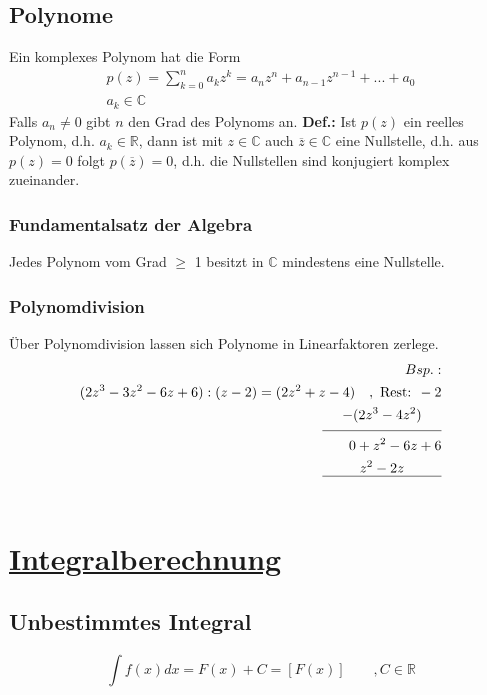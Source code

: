 \documentclass[12pt,a4paper]{article}%
\numberwithin{equation}{section}
\newcommand{\R}{\mathbb{R}} %
\newcommand{\C}{\mathbb{C}}
\def\defF{\textbf{Def.: }}
\numberwithin{equation}{subsection}
\begin{document}
  \subsection{Polynome}
  Ein komplexes Polynom hat die Form
  \begin{align}
    p(z) = \sum_{k=0}^n a_k z^k = a_n z^n + a_{n-1} z^{n-1} + ... + a_0 \\
    a_k \in \C \nonumber
  \end{align}
  Falls $a_n \neq 0$ gibt $n$ den Grad des Polynoms an.
  \newline
  \defF \glqq Ist $p(z)$ ein reelles Polynom, d.h. $a_k \in \R$, dann ist mit $z\in \C$ auch 
  $\overline{z} \in \C$ eine Nullstelle, d.h. aus $p(z) = 0$ folgt $p(\overline{z}) = 0$, d.h. die
  Nullstellen sind konjugiert komplex zueinander. \grqq \cite{HM12}

	\subsubsection{Fundamentalsatz der Algebra}
	  Jedes Polynom vom Grad $\geq$ 1 besitzt in $\C$ mindestens eine Nullstelle. 
  
  \subsubsection{Polynomdivision}
    Über Polynomdivision lassen sich Polynome in Linearfaktoren zerlege. 
    \begin{align}
      Bsp.:  \nonumber\\
      (2z^3 - 3z^2 -6z +6) : (z-2) = (2z^2 +z -4)\quad ,\text{ Rest: } -2 \nonumber\\
      \underset{\text{\rule{3cm}{0.4pt}}}{-(2z^3 - 4z^2)} \nonumber \\
      0 + z^2 - 6z + 6 \nonumber \\
      \qquad \underset{\text{\rule[5mm]{3cm}{0.4pt}}}{z^2-2z} \nonumber \\
    \end{align}








\section{\underline{Integralberechnung}}
\subsection{Unbestimmtes Integral}
\begin{equation}
\int f(x) dx = F(x) + C = [F(x)]\qquad, C\in\R \label{eq:def_noBorder}
\end{equation}
\end{document}
